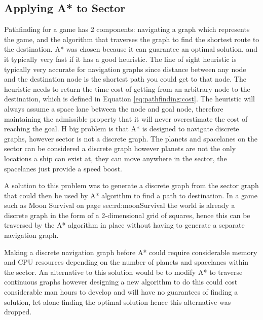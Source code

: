 \subsection{Applying A* to Sector}
Pathfinding for a game has 2 components: navigating a graph which represents the game, and the algorithm that traverses the graph to find the shortest route to the destination.
A* was chosen because it can guarantee an optimal solution, and it typically very fast if it has a good heuristic. 
The line of sight heuristic is typically very accurate for navigation graphs since distance between any node and the destination node is the shortest path you could get to that node.
The heuristic needs to return the time cost of getting from an arbitrary node to the destination, which is defined in Equation \ref{eq:pathfinding:cost}.
The heuristic will always assume a space lane between the node and goal node, therefore maintaining the admissible property that it will never overestimate the cost of reaching the goal.
H big problem is that A* is designed to navigate discrete graphs, however sector is not a discrete graph.
The planets and spacelanes on the sector can be considered a discrete graph however planets are not the only locations a ship can exist at, they can move anywhere in the sector, the spacelanes just provide a speed boost.

A solution to this problem was to generate a discrete graph from the sector graph that could then be used by A* algorithm to find a path to destination. 
In a game such as Moon Survival on page {sec:rd:moonSurvival} the world is already a discrete graph in the form of a 2-dimensional grid of squares, hence this can be traversed by the A* algorithm in place without having to generate a separate navigation graph.

Making a discrete navigation graph before A* could require considerable memory and CPU resources depending on the number of planets and spacelanes within the sector.
An alternative to this solution would be to modify A* to traverse continuous graphs however designing a new algorithm to do this could cost considerable man hours to develop and will have no guarantees of finding a solution, let alone finding the optimal solution hence this alternative was dropped.

